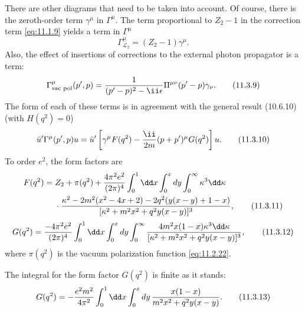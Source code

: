 There are other diagrams that need to be taken into account. Of course,
there is the zeroth-order term $\gamma^\mu$ in $\Gamma^\mu$. The term
proportional to $Z_2-1$ in the correction term \eqref{eq:11.1.9} yields a term in
$\Gamma^\mu$
\begin{equation}
\Gamma^\mu_{\mathcal L_2}=(Z_2-1)\gamma^\mu.
\tag{11.3.8}\label{eq:11.3.8}
\end{equation}
Also, the effect of insertions of corrections to the external photon
propagator is a term:
\begin{equation}
\Gamma^\mu_{\text{vac pol}}(p',p)=
 {1\over(p'-p)^2-\ii\epsilon}\Pi^{\mu\nu}(p'-p)\gamma_\nu.
\tag{11.3.9}\label{eq:11.3.9}
\end{equation}
The form of each of these terms is in agreement with the general result
(10.6.10) (with $H(q^2)=0$)
\begin{equation}
\bar u'\Gamma^\mu(p',p)u
=\bar u'\left[\gamma^\mu F(q^2)-{\ii\over2m}(p+p')^\mu G(q^2)\right]u.
\tag{11.3.10}\label{eq:11.3.10}
\end{equation}
To order $e^2$, the form factors are
\begin{align}
F(q^2)={}&Z_2+\pi(q^2)+{4\pi^2e^2\over(2\pi)^4}
 \int_0^1\dd x\int_0^xdy\int_0^\infty\kappa^3\dd\kappa\notag\\
&\cdot{\kappa^2-2m^2(x^2-4x+2)-2q^2(y(x-y)+1-x)
 \over[\kappa^2+m^2x^2+q^2y(x-y)]^3},
\tag{11.3.11}\label{eq:11.3.11}
\end{align}
\begin{equation}
G(q^2)={-4\pi^2e^2\over(2\pi)^4}
 \int_0^1\dd x\int_0^xdy\int_0^\infty
 {4m^2x(1-x)\kappa^3\dd\kappa
 \over[\kappa^2+m^2x^2+q^2y(x-y)]^3},
\tag{11.3.12}\label{eq:11.3.12}
\end{equation}
where $\pi(q^2)$ is the vacuum polarization function \eqref{eq:11.2.22}.

The integral for the form factor $G(q^2)$ is finite as it stands:
\begin{equation}
G(q^2)=-{e^2m^2\over4\pi^2}\int_0^1\dd x\int_0^xdy\,
 {x(1-x)\over m^2x^2+q^2y(x-y)}.
\tag{11.3.13}\label{eq:11.3.13}
\end{equation}

\suppressfloats[t]


